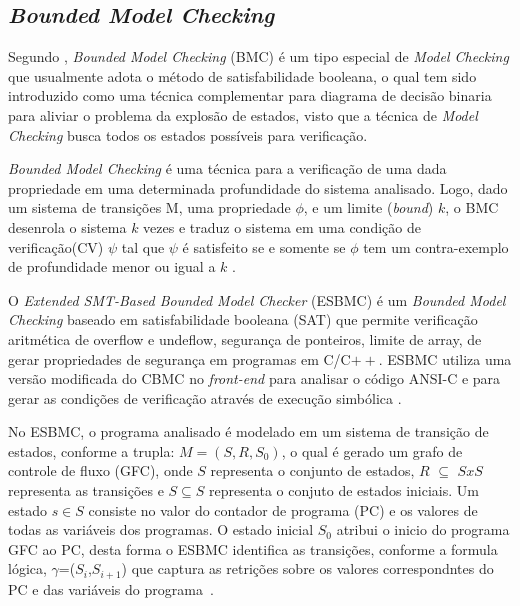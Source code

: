 

\subsection{\label{cap:bounded}\textit{Bounded Model Checking}}
Segundo \citeauthor{rocha2015verificaccao}, \textit{Bounded Model Checking} (BMC) é um tipo especial de \textit{Model Checking} que usualmente adota o método de satisfabilidade booleana, o qual tem sido introduzido como uma técnica complementar para diagrama de decisão binaria para aliviar o problema da explosão de estados, visto que a técnica de \textit{Model Checking} busca todos os estados possíveis para verificação.

\par
\textit{Bounded Model Checking} é uma técnica para a verificação de uma dada propriedade em uma determinada profundidade do sistema analisado. Logo, dado um sistema de transições M, uma propriedade $\phi$, e um limite (\textit{bound}) $k$, o BMC desenrola o sistema $k$ vezes e traduz o sistema em uma condição de verificação(CV) $\psi$ tal que $\psi$ é satisfeito se e somente se $\phi$ tem um contra-exemplo de profundidade menor ou igual a $k$ \cite{rocha2015verificaccao}.

\par
O \textit{Extended SMT-Based Bounded Model Checker} (ESBMC) é um \textit{Bounded Model Checking} baseado em satisfabilidade booleana (SAT) que permite verificação aritmética de overflow e undeflow, segurança de ponteiros, limite de array, de gerar propriedades de segurança em programas em C/C$++$. ESBMC utiliza uma versão modificada do CBMC no \textit{front-end} para analisar o código ANSI-C e para gerar as condições de verificação através de execução simbólica \cite{cordeiro2012smt,rocha2015verificaccao}.

\par
No ESBMC, o programa analisado é modelado em um sistema de transição de estados, conforme a trupla: $M=(S,R,S_{0})$, o qual é gerado um grafo de controle de fluxo (GFC), onde $S$ representa o conjunto de estados, $R$ $\subseteq$ $SxS$ representa as transições e $S \subseteq S$ representa o conjuto de estados iniciais. Um estado $s \in S$ consiste no valor do contador de programa (PC) e os valores de todas as variáveis dos programas. O estado inicial $S_{0}$ atribui o inicio do programa GFC ao PC, desta forma o ESBMC identifica as transições, conforme a formula lógica, $\gamma$=($S_{i}$,$S_{i+1}$) que captura as retrições sobre os valores correspondntes do PC e das variáveis do programa~\cite{cordeiro2012smt}.


